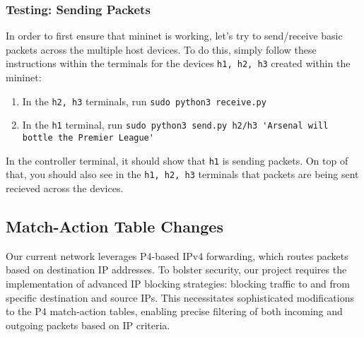 \subsubsection{Testing: Sending Packets}
In order to first ensure that mininet is working, let's try to send/receive basic packets across the multiple host devices. To do this, simply follow these instructions within the terminals for the devices \verb|h1, h2, h3| created within the mininet:
\begin{enumerate}
    \item In the \verb|h2, h3| terminals, run \verb|sudo python3 receive.py|
    \item In the \verb|h1| terminal, run \verb|sudo python3 send.py h2/h3 'Arsenal will bottle the Premier League'|
\end{enumerate}
In the controller terminal, it should show that \verb|h1| is sending packets. On top of that, you should also see in the \verb|h1, h2, h3| terminals that packets are being sent recieved across the devices.
\subsection{Match-Action Table Changes}
Our current network leverages P4-based IPv4 forwarding, which routes packets based on destination IP addresses. To bolster security, our project requires the implementation of advanced IP blocking strategies: blocking traffic to and from specific destination and source IPs. This necessitates sophisticated modifications to the P4 match-action tables, enabling precise filtering of both incoming and outgoing packets based on IP criteria. 
